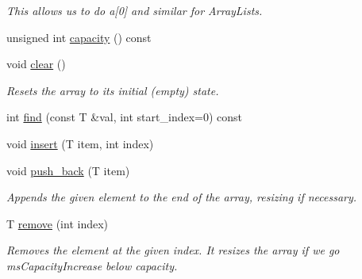 \begin{DoxyCompactItemize}
\begin{DoxyCompactList}\small\item\em This allows us to do a\mbox{[}0\mbox{]} and similar for Array\+Lists. \end{DoxyCompactList}\item 
unsigned int \mbox{\hyperlink{classssuds_1_1_array_list_a4e9f0d67b921ddde2da06bdef3012ca8}{capacity}} () const
\item 
\mbox{\label{classssuds_1_1_array_list_a29f9aaf226d5c6fde758546102150271}} 
void \mbox{\hyperlink{classssuds_1_1_array_list_a29f9aaf226d5c6fde758546102150271}{clear}} ()
\begin{DoxyCompactList}\small\item\em Resets the array to its initial (empty) state. \end{DoxyCompactList}\item 
int \mbox{\hyperlink{classssuds_1_1_array_list_af435c00e4e53303bc0bbe2cef518d4a7}{find}} (const T \&val, int start\+\_\+index=0) const
\item 
void \mbox{\hyperlink{classssuds_1_1_array_list_af22d4711bb7666f9c4706ca491b1fafe}{insert}} (T item, int index)
\item 
\mbox{\label{classssuds_1_1_array_list_aa12ddd66cdfd7f7f36285c16c5c0a8c7}} 
void \mbox{\hyperlink{classssuds_1_1_array_list_aa12ddd66cdfd7f7f36285c16c5c0a8c7}{push\+\_\+back}} (T item)
\begin{DoxyCompactList}\small\item\em Appends the given element to the end of the array, resizing if necessary. \end{DoxyCompactList}\item 
\mbox{\label{classssuds_1_1_array_list_a4b254608d7f7936f52c9e5430d7cc20f}} 
T \mbox{\hyperlink{classssuds_1_1_array_list_a4b254608d7f7936f52c9e5430d7cc20f}{remove}} (int index)
\begin{DoxyCompactList}\small\item\em Removes the element at the given index. It resizes the array if we go ms\+Capacity\+Increase below capacity. \end{DoxyCompactList}\item 
\mbox{\label{classssuds_1_1_array_list_adbcd61184deb92c36610e47b91a7b6d5}} 

\end{DoxyCompactItemize}
